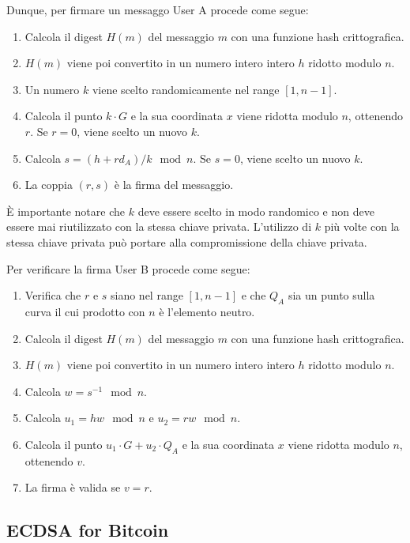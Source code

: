 \documentclass{article}
\begin{document}
Dunque, per firmare un messaggo User A procede come segue:
\begin{enumerate} %
	\item Calcola il digest $H(m)$ del messaggio $m$ con una funzione hash crittografica.
	\item $H(m)$ viene poi convertito in un numero intero intero $h$ ridotto modulo $n$.
	\item Un numero $k$ viene scelto randomicamente nel range $[1, n-1]$.
	\item Calcola il punto $k \cdot G$ e la sua coordinata $x$ viene ridotta modulo $n$, ottenendo $r$. Se $r = 0$, viene scelto un nuovo $k$.
	\item Calcola $s = (h + rd_A)/k \mod n$. Se $s = 0$, viene scelto un nuovo $k$.
	\item La coppia $(r, s)$ è la firma del messaggio.
\end{enumerate} %

È importante notare che $k$ deve essere scelto in modo randomico e non deve essere mai riutilizzato con la stessa chiave privata.
L'utilizzo di $k$ più volte con la stessa chiave privata può portare alla compromissione della chiave privata.

Per verificare la firma User B procede come segue:
\begin{enumerate} %
	\item Verifica che $r$ e $s$ siano nel range $[1, n-1]$ e che $Q_A$ sia un punto sulla curva il cui prodotto con $n$ è l'elemento neutro.
	\item Calcola il digest $H(m)$ del messaggio $m$ con una funzione hash crittografica.
	\item $H(m)$ viene poi convertito in un numero intero intero $h$ ridotto modulo $n$.
	\item Calcola $w = s^{-1} \mod n$.
	\item Calcola $u_1 = hw \mod n$ e $u_2 = rw \mod n$.
	\item Calcola il punto $u_1 \cdot G + u_2 \cdot Q_A$ e la sua coordinata $x$ viene ridotta modulo $n$, ottenendo $v$.
	\item La firma è valida se $v = r$.
\end{enumerate} %

\subsection{ECDSA for Bitcoin}
\end{document}
